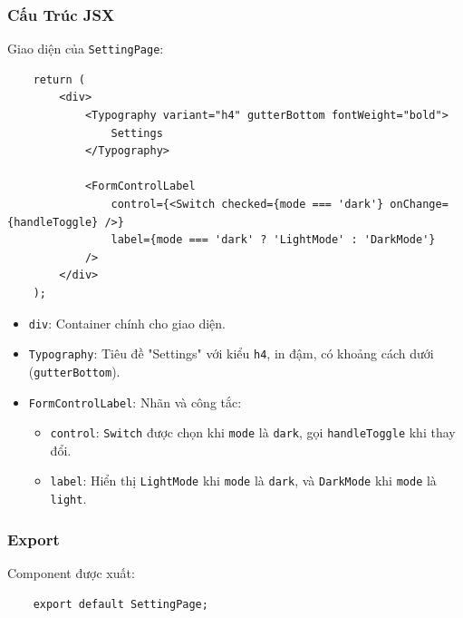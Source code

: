             \subsubsection{Cấu Trúc JSX}
                \hspace*{0.6cm}Giao diện của \texttt{SettingPage}:
                \begin{lstlisting}
    return (
        <div>
            <Typography variant="h4" gutterBottom fontWeight="bold">
                Settings
            </Typography>

            <FormControlLabel
                control={<Switch checked={mode === 'dark'} onChange={handleToggle} />}
                label={mode === 'dark' ? 'LightMode' : 'DarkMode'}
            />
        </div>
    );
                \end{lstlisting}
                \begin{itemize}
                    \item \texttt{div}: Container chính cho giao diện.
                    \item \texttt{Typography}: Tiêu đề "Settings" với kiểu \texttt{h4}, in đậm, có khoảng cách dưới (\texttt{gutterBottom}).
                    \item \texttt{FormControlLabel}: Nhãn và công tắc:
                    \begin{itemize}
                        \item \texttt{control}: \texttt{Switch} được chọn khi \texttt{mode} là \texttt{dark}, gọi \texttt{handleToggle} khi thay đổi.
                        \item \texttt{label}: Hiển thị \texttt{LightMode} khi \texttt{mode} là \texttt{dark}, và \texttt{DarkMode} khi \texttt{mode} là \texttt{light}.
                    \end{itemize}
                \end{itemize}

            \subsubsection{Export}
                \hspace*{0.6cm}Component được xuất:
                \begin{lstlisting}
    export default SettingPage;
                \end{lstlisting}

